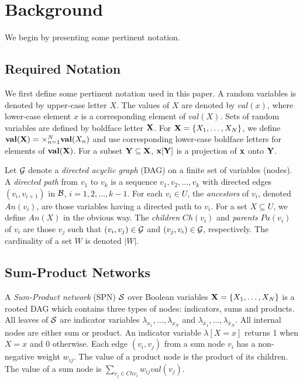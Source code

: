 \section{Background}

We begin by presenting some pertinent notation.

\subsection{Required Notation}

We first define some pertinent notation used in this paper.
A random variables is denoted by upper-case letter $X$.
The values of $X$ are denoted by $val(x)$, where lower-case element $x$ is a corresponding element of $val(X)$.
Sets of random variables are defined by boldface letter ${\bf X}$.
For ${\bf X} = \{X_1,\dots,X_N\}$, we define ${\bf val(X)} = \times^{N}_{n=1}{{\bf val}(X_n)}$ and use corresponding lower-case boldface  letters for elements of ${\bf val(X)}$.
For a subset ${\bf Y \subseteq X}$, ${\bf x[Y]}$ is a projection of ${\bf x}$ onto ${\bf Y}$.

Let ${\cal G}$ denote a \emph{directed acyclic graph} (DAG) on a finite set of variables (nodes).
A \emph{directed path} from $v_1$ to $v_k$ is a sequence $v_1, v_2, \ldots , v_k$ with directed edges $(v_i, v_{i+1})$ in ${\cal B}$, $i = 1, 2,\ldots, k-1$.
For each $v_i \in U$, the \emph{ancestors} of $v_i$, denoted $An(v_i)$, are those variables having a directed path to $v_i$.
For a set $X \subseteq U$, we define $An(X)$ in the obvious way.
The \emph{children} $Ch(v_i)$ and \emph{parents} $Pa(v_i)$ of $v_i$ are those $v_j$ such that $(v_i,v_j) \in {\cal G}$ and $(v_j,v_i) \in {\cal G}$, respectively.
The cardinality of a set $W$ is denoted $|W|$.


\subsection{Sum-Product Networks}

A \emph{Sum-Product network} (SPN) $\cal S$ over Boolean variables ${\bf X} = \{X_1,\dots,X_N\}$ is a rooted DAG which contains three types of nodes: indicators, sums and products.
All leaves of $\cal S$ are indicator variables $\lambda_{x_1},\ldots,\lambda_{x_N}$ and $\lambda_{\bar{x}_1},\ldots,\lambda_{\bar{x}_N}$.
All internal nodes are either sum or product.
An indicator variable $\lambda[X=x]$ returns 1 when $X=x$ and 0 otherwise.
Each edge $(v_i,v_j)$ from a sum node $v_i$ has a non-negative weight $w_{ij}$.
The value of a product node is the product of its children.
The value of a sum node is $\sum_{v_j \in Ch{v_i}}{w_{ij}val(v_j)}$.

